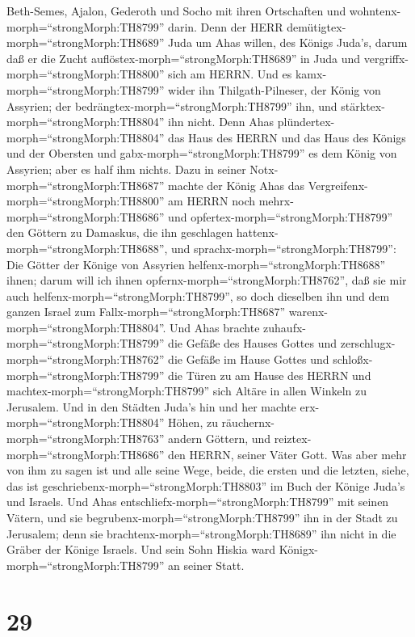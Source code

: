 Beth-Semes, Ajalon, Gederoth und Socho mit ihren Ortschaften und
wohntenx-morph=``strongMorph:TH8799'' darin.  Denn der HERR
demütigtex-morph=``strongMorph:TH8689'' Juda um Ahas willen, des Königs
Juda's, darum daß er die Zucht auflöstex-morph=``strongMorph:TH8689'' in
Juda und vergriffx-morph=``strongMorph:TH8800'' sich am HERRN.
 Und es kamx-morph=``strongMorph:TH8799'' wider ihn
Thilgath-Pilneser, der König von Assyrien; der
bedrängtex-morph=``strongMorph:TH8799'' ihn, und
stärktex-morph=``strongMorph:TH8804'' ihn nicht.  Denn Ahas
plündertex-morph=``strongMorph:TH8804'' das Haus des HERRN und das Haus
des Königs und der Obersten und gabx-morph=``strongMorph:TH8799'' es dem
König von Assyrien; aber es half ihm nichts.  Dazu in
seiner Notx-morph=``strongMorph:TH8687'' machte der König Ahas das
Vergreifenx-morph=``strongMorph:TH8800'' am HERRN noch
mehrx-morph=``strongMorph:TH8686''  und
opfertex-morph=``strongMorph:TH8799'' den Göttern zu Damaskus, die ihn
geschlagen hattenx-morph=``strongMorph:TH8688'', und
sprachx-morph=``strongMorph:TH8799'': Die Götter der Könige von Assyrien
helfenx-morph=``strongMorph:TH8688'' ihnen; darum will ich ihnen
opfernx-morph=``strongMorph:TH8762'', daß sie mir auch
helfenx-morph=``strongMorph:TH8799'', so doch dieselben ihn und dem
ganzen Israel zum Fallx-morph=``strongMorph:TH8687''
warenx-morph=``strongMorph:TH8804''.  Und Ahas brachte
zuhaufx-morph=``strongMorph:TH8799'' die Gefäße des Hauses Gottes und
zerschlugx-morph=``strongMorph:TH8762'' die Gefäße im Hause Gottes und
schloßx-morph=``strongMorph:TH8799'' die Türen zu am Hause des HERRN und
machtex-morph=``strongMorph:TH8799'' sich Altäre in allen Winkeln zu
Jerusalem.  Und in den Städten Juda's hin und her machte
erx-morph=``strongMorph:TH8804'' Höhen, zu
räuchernx-morph=``strongMorph:TH8763'' andern Göttern, und
reiztex-morph=``strongMorph:TH8686'' den HERRN, seiner Väter Gott.
 Was aber mehr von ihm zu sagen ist und alle seine Wege,
beide, die ersten und die letzten, siehe, das ist
geschriebenx-morph=``strongMorph:TH8803'' im Buch der Könige Juda's und
Israels.  Und Ahas entschliefx-morph=``strongMorph:TH8799''
mit seinen Vätern, und sie begrubenx-morph=``strongMorph:TH8799'' ihn in
der Stadt zu Jerusalem; denn sie brachtenx-morph=``strongMorph:TH8689''
ihn nicht in die Gräber der Könige Israels. Und sein Sohn Hiskia ward
Königx-morph=``strongMorph:TH8799'' an seiner Statt.

\hypertarget{section-28}{%
\section{29}\label{section-28}}

